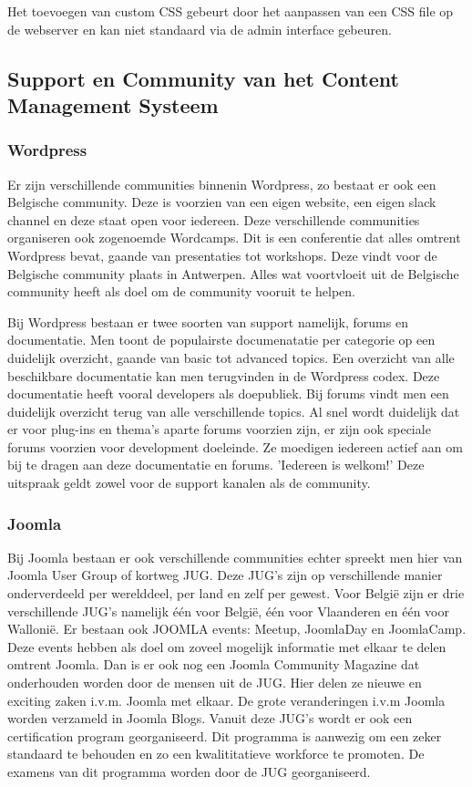 Het toevoegen van custom CSS gebeurt door het aanpassen van een CSS file op de webserver en kan niet standaard via de admin interface gebeuren.
\subsection{Support en Community van het Content Management Systeem}
\subsubsection{Wordpress}
Er zijn verschillende communities binnenin Wordpress, zo bestaat er ook een Belgische community. Deze is voorzien van een eigen website, een eigen slack channel en deze staat open voor iedereen. Deze verschillende communities organiseren ook zogenoemde Wordcamps. Dit is een conferentie dat alles omtrent Wordpress bevat, gaande van presentaties tot workshops. Deze vindt voor de Belgische community plaats in Antwerpen. Alles wat voortvloeit uit de Belgische community heeft als doel om de community vooruit te helpen.

Bij Wordpress bestaan er twee soorten van support namelijk, forums en documentatie. Men toont de populairste documenatatie per categorie op een duidelijk overzicht, gaande van basic tot advanced topics. Een overzicht van alle beschikbare documentatie kan men terugvinden in de Wordpress codex. Deze documentatie heeft vooral developers als doepubliek. Bij forums vindt men een duidelijk overzicht terug van alle verschillende topics. Al snel wordt duidelijk dat er voor plug-ins en thema's aparte forums voorzien zijn, er zijn ook speciale forums voorzien voor development doeleinde. Ze moedigen iedereen actief aan om bij te dragen aan deze documentatie en forums. 'Iedereen is welkom!' Deze uitspraak geldt zowel voor de support kanalen als de community.
\subsubsection{Joomla}
Bij Joomla bestaan er ook verschillende communities echter spreekt men hier van Joomla User Group of kortweg JUG. Deze JUG's zijn op verschillende manier onderverdeeld per werelddeel, per land en zelf per gewest. Voor België zijn er drie verschillende JUG's namelijk één voor België, één voor Vlaanderen en één voor Wallonië. Er bestaan ook JOOMLA events: Meetup, JoomlaDay en JoomlaCamp. Deze events hebben als doel om zoveel mogelijk informatie met  elkaar te delen omtrent Joomla. Dan is er ook nog een Joomla Community Magazine dat onderhouden worden door de mensen uit de JUG. Hier delen ze nieuwe en exciting zaken i.v.m. Joomla met elkaar. De grote veranderingen i.v.m Joomla worden verzameld in Joomla Blogs. Vanuit deze JUG's wordt er ook een certification program georganiseerd. Dit programma is aanwezig om een zeker standaard te behouden en zo een kwalititatieve workforce te promoten. De examens van dit programma worden door de JUG georganiseerd.

